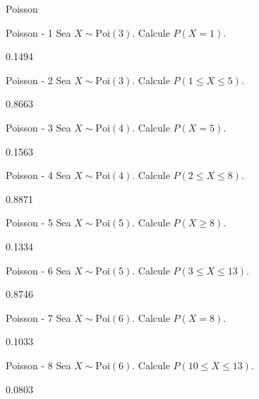 \documentclass[a4,11pt]{aleph-notas}
\newcommand{\Poi}{\text{Poi}}
\begin{document}
\begin{quiz}{Poisson}

\begin{numerical}[tolerance=0.01]%
    {Poisson - 1}
    Sea \( X \sim \Poi(3) \). Calcule \( P(X = 1) \).
    \item[] 0.1494
\end{numerical}

\begin{numerical}[tolerance=0.01]%
    {Poisson - 2}
    Sea \( X \sim \Poi(3) \). Calcule \( P(1 \leq X \leq 5) \).
    \item[] 0.8663
\end{numerical}

\begin{numerical}[tolerance=0.01]%
    {Poisson - 3}
    Sea \( X \sim \Poi(4) \). Calcule \( P(X = 5) \).
    \item[] 0.1563
\end{numerical}

\begin{numerical}[tolerance=0.01]%
    {Poisson - 4}
    Sea \( X \sim \Poi(4) \). Calcule \( P(2 \leq X \leq 8) \).
    \item[] 0.8871
\end{numerical}

\begin{numerical}[tolerance=0.01]%
    {Poisson - 5}
    Sea \( X \sim \Poi(5) \). Calcule \( P(X \geq 8) \).
    \item[] 0.1334
\end{numerical}

\begin{numerical}[tolerance=0.01]%
    {Poisson - 6}
    Sea \( X \sim \Poi(5) \). Calcule \( P(3 \leq X \leq 13) \).
    \item[] 0.8746
\end{numerical}

\begin{numerical}[tolerance=0.01]%
    {Poisson - 7}
    Sea \( X \sim \Poi(6) \). Calcule \( P(X = 8) \).
    \item[] 0.1033
\end{numerical}

\begin{numerical}[tolerance=0.01]%
    {Poisson - 8}
    Sea \( X \sim \Poi(6) \). Calcule \( P(10 \leq X \leq 13) \).
    \item[] 0.0803
\end{numerical}




\end{quiz}
\end{document}
